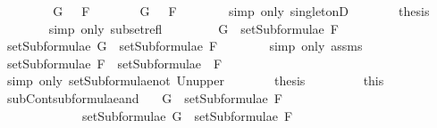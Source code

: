 \begin{isabellebody}
\ \ \isamarkupfalse%
\isanewline
\ \ \ \ \isamarkupfalse%
\ {\isachardoublequoteopen}G\ {\isasymin}\ {\isacharbraceleft}\isactrlbold {\isasymnot}\ F{\isacharbraceright}{\isachardoublequoteclose}\isanewline
\ \ \ \ \isamarkupfalse%
\ \isamarkupfalse%
\ {\isachardoublequoteopen}G\ {\isacharequal}\ \isactrlbold {\isasymnot}\ F{\isachardoublequoteclose}\isanewline
\ \ \ \ \ \ \isamarkupfalse%
\ {\isacharparenleft}simp\ only{\isacharcolon}\ singletonD{\isacharparenright}\isanewline
\ \ \ \ \isamarkupfalse%
\ \isamarkupfalse%
\ {\isacharquery}thesis\isanewline
\ \ \ \ \ \ \isamarkupfalse%
\ {\isacharparenleft}simp\ only{\isacharcolon}\ subset{\isacharunderscore}refl{\isacharparenright}\isanewline
\ \ \isamarkupfalse%
\isanewline
\ \ \ \ \isamarkupfalse%
\ {\isachardoublequoteopen}G\ {\isasymin}\ setSubformulae\ F{\isachardoublequoteclose}\isanewline
\ \ \ \ \isamarkupfalse%
\ \isamarkupfalse%
\ {\isachardoublequoteopen}setSubformulae\ G\ {\isasymsubseteq}\ setSubformulae\ F{\isachardoublequoteclose}\isanewline
\ \ \ \ \ \ \isamarkupfalse%
\ {\isacharparenleft}simp\ only{\isacharcolon}\ assms{\isacharparenleft}{}{\isacharparenright}{\isacharparenright}\isanewline
\ \ \ \ \isamarkupfalse%
\ \isamarkupfalse%
\ {\isachardoublequoteopen}setSubformulae\ F\ {\isasymsubseteq}\ setSubformulae\ {\isacharparenleft}\isactrlbold {\isasymnot}\ F{\isacharparenright}{\isachardoublequoteclose}\isanewline
\ \ \ \ \ \ \isamarkupfalse%
\ {\isacharparenleft}simp\ only{\isacharcolon}\ setSubformulae{\isacharunderscore}not\ Un{\isacharunderscore}upper{}{\isacharparenright}\isanewline
\ \ \ \ \isamarkupfalse%
\ \isamarkupfalse%
\ {\isacharquery}thesis\ \isanewline
\ \ \ \ \ \ \isamarkupfalse%
\ this\isanewline
\ \ \isamarkupfalse%
\isanewline
{}\isamarkupfalse%
%
\endisatagproof
{\isafoldproof}%
%
\isadelimproof
\isanewline
%
\endisadelimproof
\isanewline
{}\isamarkupfalse%
\ subContsubformulae{\isacharunderscore}and{\isacharcolon}\isanewline
\ \ \ {\isachardoublequoteopen}G\ {\isasymin}\ setSubformulae\ F{}\ \isanewline
\ \ \ \ \ \ \ \ \ \ \ \ {\isasymLongrightarrow}\ setSubformulae\ G\ {\isasymsubseteq}\ setSubformulae\ F{}{\isachardoublequoteclose}\isanewline

\end{isabellebody}
